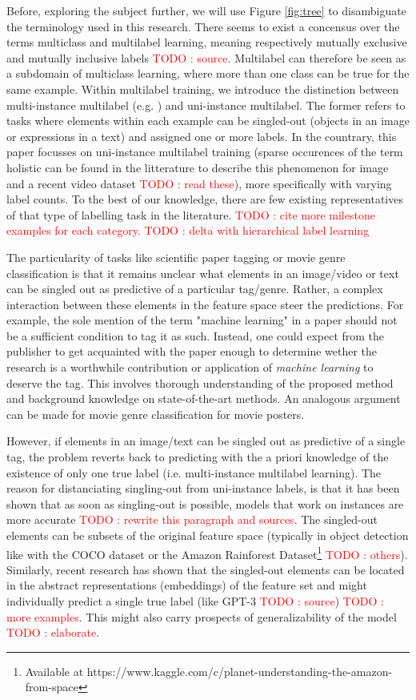\documentclass[sigconf,natbib,screen=true,review=true,anonymous]{acmart}
\newcommand\todo[1]{\textcolor{red}{TODO : #1}}
\begin{document}
Before, exploring the subject further, we will use Figure \ref{fig:tree} to disambiguate the terminology used in this research. There seems to exist a concensus over the terms multiclass and multilabel learning, meaning respectively mutually exclusive and mutually inclusive labels \todo{source}. Multilabel can therefore be seen as a subdomain of multiclass learning, where more than one class can be true for the same example. Within multilabel training, we introduce the distinction between multi-instance multilabel (e.g. \cite{multiInstance}) and uni-instance multilabel. The former refers to tasks where elements within each example can be singled-out (objects in an image or expressions in a text) and assigned one or more labels. In the countrary, this paper focusses on uni-instance multilabel training (sparse occurences of the term holistic can be found in the litterature to describe this phenomenon for image \cite{holisticImageDescriptors,holisticLungs} and a recent video dataset \cite{holisticVideoData} \todo{read these}), more specifically with varying label counts. To the best of our knowledge, there are few existing representatives of that type of labelling task in the literature. \todo{cite more milestone examples for each category.} \todo{delta with hierarchical label learning}

The particularity of tasks like scientific paper tagging or movie genre classification is that it remains unclear what elements in an image/video or text can be singled out as predictive of a particular tag/genre. Rather, a complex interaction between these elements in the feature space steer the predictions. For example, the sole mention of the term "machine learning" in a paper should not be a sufficient condition to tag it as such. Instead, one could expect from the publisher to get acquainted with the paper enough to determine wether the research is a worthwhile contribution or application of \emph{machine learning} to deserve the tag. This involves thorough understanding of the proposed method and background knowledge on state-of-the-art methods. An analogous argument can be made for movie genre classification for movie posters.

However, if elements in an image/text can be singled out as predictive of a single tag, the problem reverts back to predicting with the a priori knowledge of the existence of only one true label (i.e. multi-instance multilabel learning).  The reason for distanciating singling-out from uni-instance labels, is that it has been shown that as soon as singling-out is possible, models that work on instances are more accurate \todo{rewrite this paragraph and sources}. The singled-out elements can be subsets of the original feature space (typically in object detection like with the COCO dataset  \cite{COCO} or the Amazon Rainforest Dataset\footnote{Available at https://www.kaggle.com/c/planet-understanding-the-amazon-from-space} \todo{others}). Similarly, recent research has shown that the singled-out elements can be located in the abstract representations (embeddings) of the feature set and might individually predict a single true label (like GPT-3 \todo{source}) \todo{more examples}. This might also carry prospects of generalizability of the model \cite{generalization} \todo{elaborate}. 
\end{document}
